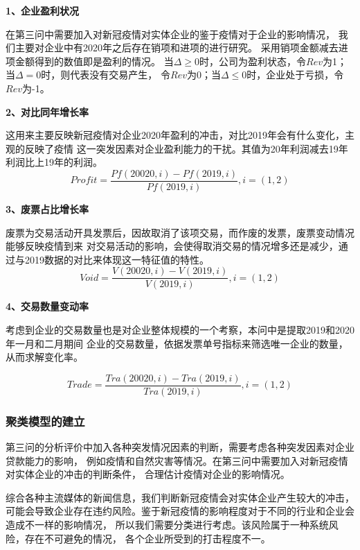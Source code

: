 \documentclass[UTF8]{ctexart}
\begin{document}
		\textbf{1、企业盈利状况}
		
		在第三问中需要加入对新冠疫情对实体企业的鉴于疫情对于企业的影响情况，
		我们主要对企业中有2020年之后存在销项和进项的进行研究。
		采用销项金额减去进项金额得到的数值即是盈利的情况。
		当$\Delta \ge 0$时，公司为盈利状态，令$Rev$为1；当$\Delta = 0$时，则代表没有交易产生，
		令$Rev$为0；当$\Delta \le 0$时，企业处于亏损，令$Rev$为-1。
		
		\textbf{2、对比同年增长率}
		
		这用来主要反映新冠疫情对企业2020年盈利的冲击，对比2019年会有什么变化，主观的反映了疫情
		这一突发因素对企业盈利能力的干扰。其值为20年利润减去19年利润比上19年的利润。
		\begin{equation}
			Profit = \frac{Pf(20020,i)-Pf(2019,i)}{Pf(2019,i)},i=(1,2) 
		\end{equation}
		
		\textbf{3、废票占比增长率}
		
		废票为交易活动开具发票后，因故取消了该项交易，而作废的发票，废票变动情况能够反映疫情到来
		对交易活动的影响，会使得取消交易的情况增多还是减少，通过与2019数据的对比来体现这一特征值的特性。
		\begin{equation}
			Void = \frac{V(20020,i)-V(2019,i)}{V(2019,i)},i=(1,2) 
		\end{equation}
		
		\textbf{4、交易数量变动率}
		
		考虑到企业的交易数量也是对企业整体规模的一个考察，本问中是提取2019和2020年一月和二月期间
		企业的交易数量，依据发票单号指标来筛选唯一企业的数量，从而求解变化率。
		
		\begin{equation}
			Trade = \frac{Tra(20020,i)-Tra(2019,i)}{Tra(2019,i)},i=(1,2) 
		\end{equation}
		
		
		\subsubsection{聚类模型的建立}
		
		第三问的分析评价中加入各种突发情况因素的判断，需要考虑各种突发因素对企业贷款能力的影响，
		例如疫情和自然灾害等情况。在第三问中需要加入对新冠疫情对实体企业的冲击的判断条件，
		合理估计疫情对企业的影响情况。
		
		综合各种主流媒体的新闻信息，我们判断新冠疫情会对实体企业产生较大的冲击，
		可能会导致企业存在违约风险。鉴于新冠疫情的影响程度对于不同的行业和企业会造成不一样的影响情况，
		所以我们需要分类进行考虑。该风险属于一种系统风险，存在不可避免的情况，
		各个企业所受到的打击程度不一。
		
\end{document}
